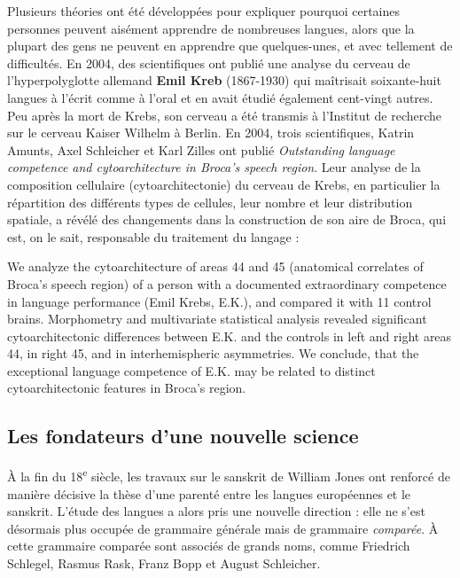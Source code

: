 Plusieurs théories ont été développées pour expliquer pourquoi certaines personnes peuvent aisément apprendre de nombreuses langues, alors que la plupart des gens ne peuvent en apprendre que quelques-unes, et avec tellement de difficultés. En 2004, des scientifiques ont publié une analyse du cerveau de l’hyperpolyglotte allemand \textbf{Emil Kreb} (1867-1930) qui maîtrisait soixante-huit langues à l’écrit comme à l’oral et en avait étudié également cent-vingt autres. Peu après la mort de Krebs, son cerveau a été transmis à l’Institut de recherche sur le cerveau Kaiser Wilhelm à Berlin. En 2004, trois scientifiques, Katrin Amunts, Axel Schleicher et Karl Zilles ont publié \textit{Outstanding language competence and cytoarchitecture in Broca’s speech region}. Leur analyse de la composition cellulaire (cytoarchitectonie) du cerveau de Krebs, en particulier la répartition des différents types de cellules, leur nombre et leur distribution spatiale, a révélé des changements dans la construction de son aire de Broca, qui est, on le sait, responsable du traitement du langage :

\begin{lecture}{}
We analyze the cytoarchitecture of areas 44 and 45 (anatomical correlates of Broca’s speech region) of a person with a documented extraordinary competence in language performance (Emil Krebs, E.K.), and compared it with 11 control brains. Morphometry and multivariate statistical analysis revealed significant cytoarchitectonic differences between E.K. and the controls in left and right areas 44, in right 45, and in interhemispheric asymmetries. We conclude, that the exceptional language competence of E.K. may be related to distinct cytoarchitectonic features in Broca’s region.
\end{lecture}

\subsection{Les fondateurs d’une nouvelle science}
À la fin du 18\textsuperscript{e} siècle, les travaux sur le sanskrit de William Jones ont renforcé de manière décisive la thèse d’une parenté entre les langues européennes et le sanskrit. L’étude des langues a alors pris une nouvelle direction : elle ne s’est désormais plus occupée de grammaire générale mais de grammaire \textit{comparée}. À cette grammaire comparée sont associés de grands noms, comme Friedrich Schlegel, Rasmus Rask, Franz Bopp et August Schleicher.

